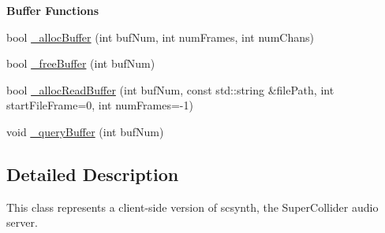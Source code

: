 \begin{Indent}{\bf Buffer Functions}\par
\begin{DoxyCompactItemize}
\item 
bool \hyperlink{classColliderPlusPlus_1_1Client__Server_aade82fef586a608c0d7ee84addc7c6c1}{\-\_\-alloc\-Buffer} (int buf\-Num, int num\-Frames, int num\-Chans)
\item 
bool \hyperlink{classColliderPlusPlus_1_1Client__Server_acae8664fb2626d8e3a608b079e63ebf6}{\-\_\-free\-Buffer} (int buf\-Num)
\item 
bool \hyperlink{classColliderPlusPlus_1_1Client__Server_a55b2f23d98d10f62e90b6c551f95bee4}{\-\_\-alloc\-Read\-Buffer} (int buf\-Num, const std\-::string \&file\-Path, int start\-File\-Frame=0, int num\-Frames=-\/1)
\item 
void \hyperlink{classColliderPlusPlus_1_1Client__Server_a009b94661bc4072d8ad198101aed1536}{\-\_\-query\-Buffer} (int buf\-Num)
\end{DoxyCompactItemize}
\end{Indent}


\subsection{Detailed Description}
This class represents a client-\/side version of scsynth, the Super\-Collider audio server. 

